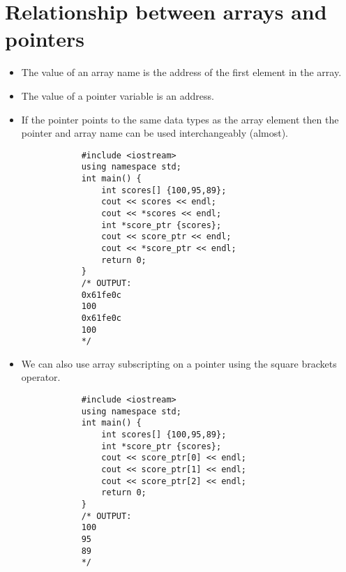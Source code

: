 \section{Relationship between arrays and pointers}
\begin{itemize}
    \item The value of an array name is the address of the first element in the array.
    \item The value of a pointer variable is an address.
    \item If the pointer points to the same data types as the array element then the pointer and array name can be used interchangeably (almost).
        \begin{verbatim}
            #include <iostream>
            using namespace std;
            int main() {
                int scores[] {100,95,89};
                cout << scores << endl;
                cout << *scores << endl;
                int *score_ptr {scores};
                cout << score_ptr << endl;
                cout << *score_ptr << endl;
                return 0;
            }
            /* OUTPUT:
            0x61fe0c
            100
            0x61fe0c
            100
            */
        \end{verbatim}
    
    \item We can also use array subscripting on a pointer using the square brackets operator.
        \begin{verbatim}
            #include <iostream>
            using namespace std;
            int main() {
                int scores[] {100,95,89};
                int *score_ptr {scores};
                cout << score_ptr[0] << endl;
                cout << score_ptr[1] << endl;
                cout << score_ptr[2] << endl;
                return 0;
            }
            /* OUTPUT:
            100
            95
            89
            */
        \end{verbatim}
    

\end{itemize}
